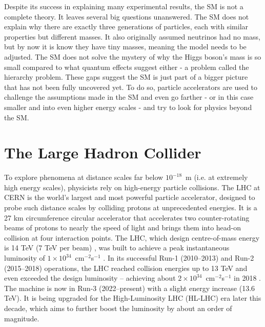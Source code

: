 Despite its success in explaining many experimental results, the SM is not a complete theory. It leaves several big questions unanswered. The SM does not explain why there are exactly three generations of particles, each with similar properties but different masses. It also originally assumed neutrinos had no mass, but by now it is know they have tiny masses, meaning the model needs to be adjusted.
The SM does not solve the mystery of why the Higgs boson’s mass is so small compared to what quantum effects suggest either - a problem called the hierarchy problem. These gaps suggest the SM is just part of a bigger picture that has not been fully uncovered yet. To do so, particle accelerators are used to challenge the assumptions made in the SM and even go farther - or in this case smaller and into even higher energy scales - and try to look for physics beyond the SM.

\section{The Large Hadron Collider}

To explore phenomena at distance scales far below $10^{-18}$ m (i.e. at extremely high energy scales), physicists rely on high-energy particle collisions. The LHC at CERN is the world’s largest and most powerful particle accelerator, designed to probe such distance scales by colliding protons at unprecedented energies. It is a 27 km circumference circular accelerator that accelerates two counter-rotating beams of protons to nearly the speed of light and brings them into head-on collision at four interaction points. The LHC, which design centre-of-mass energy is 14 TeV (7 TeV per beam) \cite{Evans:2008zzb}, was built to achieve a peak instantaneous luminosity of $1\times10^{34}$ cm$^{-2}$s$^{-1}$ \cite{Evans:2008zzb}. In its successful Run-1 (2010–2013) and Run-2 (2015–2018) operations, the LHC reached collision energies up to 13 TeV and even exceeded the design luminosity – achieving about $2\times10^{34}$ cm$^{-2}$s$^{-1}$ in 2018 \cite{Hayrapetyan_2024}. The machine is now in Run-3 (2022–present) with a slight energy increase (13.6 TeV). It is being upgraded for the High-Luminosity LHC (HL-LHC) era later this decade, which aims to further boost the luminosity by about an order of magnitude.

